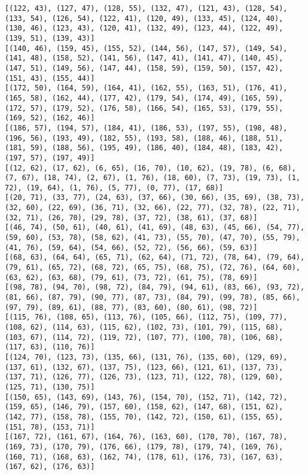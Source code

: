 \documentclass[11pt]{article}
\begin{document}
\begin{Verbatim}[commandchars=\\\{\}]
[(122, 43), (127, 47), (128, 55), (132, 47), (121, 43), (128, 54), (133, 54), (126, 54), (122, 41), (120, 49), (133, 45), (124, 40), (130, 46), (123, 43), (120, 41), (132, 49), (123, 44), (122, 49), (139, 51), (139, 43)]
[(140, 46), (159, 45), (155, 52), (144, 56), (147, 57), (149, 54), (141, 48), (158, 52), (141, 56), (147, 41), (141, 47), (140, 45), (147, 51), (149, 56), (147, 44), (158, 59), (159, 50), (157, 42), (151, 43), (155, 44)]
[(172, 50), (164, 59), (164, 41), (162, 55), (163, 51), (176, 41), (165, 58), (162, 44), (177, 42), (179, 54), (174, 49), (165, 59), (172, 57), (179, 52), (176, 58), (166, 54), (165, 53), (179, 55), (169, 52), (162, 46)]
[(186, 57), (194, 57), (184, 41), (186, 53), (197, 55), (198, 48), (196, 56), (193, 49), (182, 55), (193, 58), (188, 46), (188, 51), (181, 59), (188, 56), (195, 49), (186, 40), (184, 48), (183, 42), (197, 57), (197, 49)]
[(12, 62), (17, 62), (6, 65), (16, 70), (10, 62), (19, 78), (6, 68), (7, 67), (18, 74), (2, 67), (1, 76), (18, 60), (7, 73), (19, 73), (1, 72), (19, 64), (1, 76), (5, 77), (0, 77), (17, 68)]
[(20, 71), (33, 77), (24, 63), (37, 66), (30, 66), (35, 69), (38, 73), (32, 60), (22, 69), (36, 71), (32, 66), (22, 77), (32, 78), (22, 71), (32, 71), (26, 70), (29, 78), (37, 72), (38, 61), (37, 68)]
[(46, 74), (50, 61), (40, 61), (41, 69), (48, 63), (45, 66), (54, 77), (59, 60), (53, 78), (58, 62), (41, 73), (55, 70), (47, 70), (55, 79), (41, 76), (59, 64), (54, 66), (52, 72), (56, 66), (59, 63)]
[(68, 63), (64, 64), (65, 71), (62, 64), (71, 72), (78, 64), (79, 64), (79, 61), (65, 72), (68, 72), (65, 75), (68, 75), (72, 76), (64, 60), (63, 62), (63, 68), (79, 61), (73, 72), (61, 75), (78, 69)]
[(98, 78), (94, 70), (98, 72), (84, 79), (94, 61), (83, 66), (93, 72), (81, 66), (87, 79), (90, 77), (87, 73), (84, 79), (99, 78), (85, 66), (97, 79), (89, 61), (88, 77), (83, 60), (80, 61), (98, 72)]
[(115, 76), (108, 65), (113, 76), (105, 66), (112, 75), (109, 77), (108, 62), (114, 63), (115, 62), (102, 73), (101, 79), (115, 68), (103, 67), (114, 72), (119, 72), (107, 77), (100, 78), (106, 68), (117, 63), (110, 76)]
[(124, 70), (123, 73), (135, 66), (131, 76), (135, 60), (129, 69), (137, 61), (132, 67), (137, 75), (123, 66), (121, 61), (137, 73), (137, 71), (126, 77), (126, 73), (123, 71), (122, 78), (129, 60), (125, 71), (130, 75)]
[(150, 65), (143, 69), (143, 76), (154, 70), (152, 71), (142, 72), (159, 65), (146, 79), (157, 60), (158, 62), (147, 68), (151, 62), (142, 77), (158, 78), (155, 70), (142, 72), (150, 61), (155, 65), (151, 78), (153, 71)]
[(167, 72), (161, 67), (164, 76), (163, 60), (170, 70), (167, 78), (169, 73), (170, 79), (176, 66), (179, 78), (179, 74), (169, 76), (160, 71), (168, 63), (162, 74), (178, 61), (176, 73), (167, 63), (167, 62), (176, 63)]

\end{Verbatim}
\end{document}

